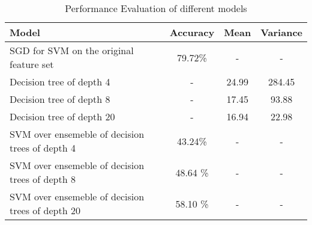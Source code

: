 \documentclass[11pt]{article}
\begin{document}
\begin{table}[h]
	\centering
	\begin{tabular}{|l|c|c|c|}
		\hline
		\textbf{Model}  & \textbf{Accuracy}  & \textbf{Mean} & \textbf{Variance} \\
		\hline
		SGD for SVM on the original feature set & 79.72\%  & - & - \\
		\hline
		Decision tree of depth 4  & - &  24.99& 284.45  \\
		\hline
		Decision tree of depth 8 & -& 17.45 & 93.88 \\
		\hline
		Decision tree of depth 20 & - &  16.94& 22.98\\
		\hline
		SVM over ensemeble of decision trees of depth 4 & 43.24\% & - &- \\
		\hline  
		SVM over ensemeble of decision trees of depth 8 & 48.64 \% &- & -\\
		\hline
		SVM over ensemeble of decision trees of depth 20 & 58.10 \% &-  & -\\
		\hline 
	\end{tabular}
	\caption{Performance Evaluation of different models}
	\label{t2}
\end{table}
\end{document}
